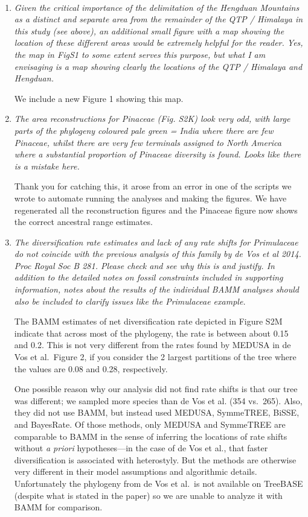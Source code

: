 \documentclass[11pt]{letter}
\begin{document}
\begin{letter}{ \\

}
\begin{enumerate}
  We have revised this paragraph for clarity (starting around line
  54).

\item \textit{Given the critical importance of the delimitation of the
    Hengduan Mountains as a distinct and separate area from the
    remainder of the QTP / Himalaya in this study (see above), an
    additional small figure with a map showing the location of these
    different areas would be extremely helpful for the reader. Yes,
    the map in FigS1 to some extent serves this purpose, but what I am
    envisaging is a map showing clearly the locations of the QTP /
    Himalaya and Hengduan.}

  We include a new Figure 1 showing this map.

\item \textit{The area reconstructions for Pinaceae (Fig. S2K) look
    very odd, with large parts of the phylogeny coloured pale green =
    India where there are few Pinaceae, whilst there are very few
    terminals assigned to North America where a substantial proportion
    of Pinaceae diversity is found. Looks like there is a mistake
    here.}

  Thank you for catching this, it arose from an error in one of the
  scripts we wrote to automate running the analyses and making the
  figures. We have regenerated all the reconstruction figures and the
  Pinaceae figure now shows the correct ancestral range estimates.

\item \textit{The diversification rate estimates and lack of any rate
    shifts for Primulaceae do not coincide with the previous analysis
    of this family by de Vos et al 2014. Proc Royal Soc B 281. Please
    check and see why this is and justify. In addition to the detailed
    notes on fossil constraints included in supporting information,
    notes about the results of the individual BAMM analyses should
    also be included to clarify issues like the Primulaceae example.}

  The BAMM estimates of net diversification rate depicted in Figure
  S2M indicate that across most of the phylogeny, the rate is between
  about 0.15 and 0.2. This is not very different from the rates found
  by MEDUSA in de Vos et al.\ Figure 2, if you consider the 2 largest
  partitions of the tree where the values are 0.08 and 0.28,
  respectively.

  One possible reason why our analysis did not find rate shifts is
  that our tree was different; we sampled more species than de Vos et
  al. (354 vs.\ 265). Also, they did not use BAMM, but instead used
  MEDUSA, SymmeTREE, BiSSE, and BayesRate. Of those methods, only
  MEDUSA and SymmeTREE are comparable to BAMM in the sense of
  inferring the locations of rate shifts without \textit{a priori}
  hypotheses---in the case of de Vos et al., that faster
  diversification is associated with heterostyly. But the methods are
  otherwise very different in their model assumptions and algorithmic
  details. Unfortunately the phylogeny from de Vos et al.\ is not
  available on TreeBASE (despite what is stated in the paper) so we
  are unable to analyze it with BAMM for comparison.


\end{enumerate}
\end{letter}
\end{document}
